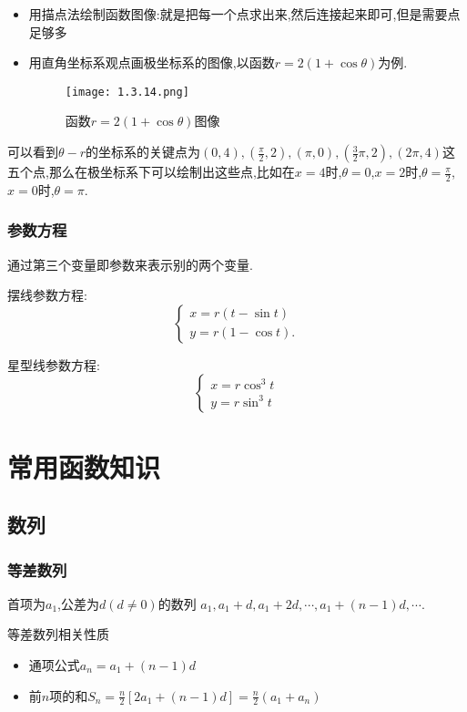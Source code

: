 \documentclass[12pt, a4paper, oneside, UTF8]{ctexbook}  %
\begin{document}
\begin{sloppypar}
    \begin{itemize}
        \item 用描点法绘制函数图像:就是把每一个点求出来,然后连接起来即可,但是需要点足够多
        \item 用直角坐标系观点画极坐标系的图像,以函数$r=2(1+\cos \theta )$为例.
              \begin{figure}[H]
                  \centering \texttt{[image: 1.3.14.png]} \caption{函数$r=2(1+\cos \theta)$图像}
              \end{figure}
    \end{itemize}
    可以看到$\theta - r $的坐标系的关键点为$(0,4),(\frac{\pi}{2},2),(\pi,0),(\frac{3}{2}\pi,2),(2\pi,4)$这五个点,那么在极坐标系下可以绘制出这些点,比如在$x=4$时,$\theta = 0$,$x=2$时,$\theta = \frac{\pi}{2}$,$x=0$时,$\theta = \pi$.
    \subsubsection{参数方程}
    通过第三个变量即参数来表示别的两个变量.

    摆线参数方程:
    $$
        \left\{
        \begin{array}{l}
            x=r\left(t-\sin t\right) \\
            y=r\left(1-\cos t\right).
        \end{array}
        \right.
    $$

    星型线参数方程:
    $$
        \left\{
        \begin{array}{l}
            x=r \cos^3 t \\
            y=r \sin^3 t
        \end{array}
        \right.
    $$
    \section{常用函数知识}

    \subsection{数列}
    \subsubsection{等差数列}
    首项为$a_1$,公差为$d(d \neq 0)$的数列 $a_1,a_1+d,a_1+2d,\cdots,a_1+(n-1)d,\cdots$.

    \begin{criterion}{等差数列相关性质}{}
        \begin{itemize}
            \item 通项公式$a_n=a_1+(n-1)d$
            \item 前$n$项的和$S_n=\frac{n}{2}[2a_1+(n-1)d]=\frac{n}{2}(a_1+a_n)$
        \end{itemize}
    \end{criterion}


\end{sloppypar}
\end{document}
